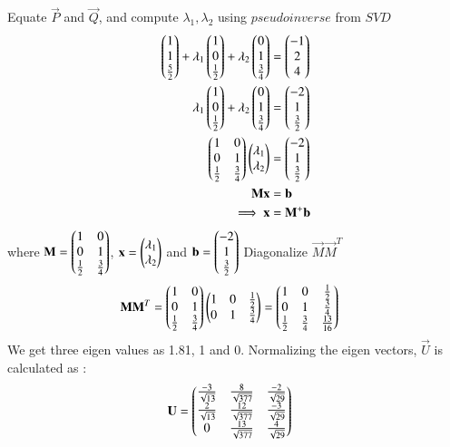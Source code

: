 \documentclass[journal,12pt,twocolumn]{IEEEtran}
\begin{document}
Equate $\vec{P}$ and $\vec{Q}$, and compute $\lambda_1, \lambda_2$ using $\textit{pseudoinverse}$ from $\textit{SVD}$
\begin{align}
	\begin{pmatrix}1\\1\\\frac{5}{2}\end{pmatrix} + \lambda_1\begin{pmatrix}1\\0\\\frac{1}{2}\end{pmatrix} + \lambda_2\begin{pmatrix}0\\1\\ \frac{3}{4}\end{pmatrix} &= \begin{pmatrix}-1\\2\\4\end{pmatrix}\\
	\lambda_1\begin{pmatrix}1\\0\\\frac{1}{2}\end{pmatrix} + \lambda_2\begin{pmatrix}0\\1\\ \frac{3}{4}\end{pmatrix} &= \begin{pmatrix}-2\\1\\\frac{3}{2}\end{pmatrix}\\
	\label{eq4}\begin{pmatrix}1 & 0\\0 & 1\\\frac{1}{2} & \frac{3}{4}\end{pmatrix} \begin{pmatrix}\lambda_1 \\ \lambda_2\end{pmatrix} &=\begin{pmatrix}-2\\1\\\frac{3}{2}\end{pmatrix}\\
	\label{eq5}\mathbf{M}\mathbf{x} &= \mathbf{b}\\
	\label{eq6}\implies\mathbf{x} &= \mathbf{M}^{+}\mathbf{b}
\end{align}
where $\mathbf{M} = \begin{pmatrix}1 & 0\\0 & 1\\\frac{1}{2} & \frac{3}{4}\end{pmatrix}$, $\mathbf{x}= \begin{pmatrix}\lambda_1 \\ \lambda_2\end{pmatrix}$ and $\mathbf{b}=\begin{pmatrix}-2\\1\\\frac{3}{2}\end{pmatrix}$
Diagonalize $\vec{M}\vec{M}^T$
\begin{align}
	\mathbf{M}\mathbf{M}^T &= \begin{pmatrix}1 & 0\\0 & 1\\\frac{1}{2} & \frac{3}{4}\end{pmatrix} \begin{pmatrix}1 & 0 & \frac{1}{2}\\0 & 1 & \frac{3}{4}\end{pmatrix} = \begin{pmatrix}1 & 0 & \frac{1}{2}\\0 & 1 & \frac{3}{4}\\ \frac{1}{2} & \frac{3}{4} & \frac{13}{16}\end{pmatrix} 
\end{align}
We get three eigen values as 1.81, 1 and 0. Normalizing the eigen vectors, $\vec{U}$ is calculated as : 
\begin{align}
	\mathbf{U} &= \begin{pmatrix}\frac{-3}{\sqrt{13}} & \frac{8}{\sqrt{377}} & \frac{-2}{\sqrt{29}} \\ \frac{2}{\sqrt{13}} & \frac{12}{\sqrt{377}} & \frac{-3}{\sqrt{29}} \\ 0 & \frac{13}{\sqrt{377}} & \frac{4}{\sqrt{29}}\end{pmatrix}  
\end{align}
\end{document}
